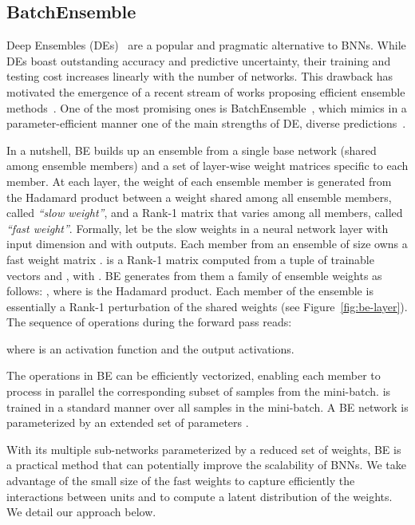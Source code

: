 \documentclass[10pt,twocolumn,letterpaper]{article}
\newcommand{\be}{BatchEnsemble\xspace}
\begin{document}
\subsection{BatchEnsemble}

Deep Ensembles (DEs)~\cite{lakshminarayanan2017simple} {are a popular and pragmatic alternative to BNNs. While DEs} boast outstanding accuracy and predictive uncertainty, 
their training and testing cost increases linearly with the number of networks. This drawback has motivated the emergence of a recent stream of works proposing efficient ensemble methods~\cite{ashukha2020pitfalls, franchi2019tradi, maddox2019simple, mehrtash2020pep, wen2020batchensemble}. One of the most promising ones is \be~\cite{wen2020batchensemble}, which mimics in a parameter-efficient manner one of the main strengths of DE, \ie diverse  predictions~\cite{fort2019deep}. 



In a nutshell, BE builds up an ensemble from a single base network (shared among ensemble members) and a set of layer-wise weight matrices specific to each member. At each layer, the weight of each ensemble member is generated from the Hadamard product between a weight shared among all ensemble members, called \emph{``slow weight''}, and a Rank-1 matrix that varies among all members, called \emph{``fast weight''}. Formally, let  be the slow weights in a neural network layer with input dimension  and with  outputs. Each member  from an ensemble of size  owns a fast weight matrix .  is a Rank-1 matrix computed from a tuple of trainable vectors  and , with . BE generates from them a family of ensemble weights as follows: , where  is the Hadamard product. Each  member of the ensemble is essentially a Rank-1 perturbation of the shared weights  (see Figure~\ref{fig:be-layer}).
The sequence of operations during the forward pass reads:

where  is an activation function and  the output activations. 

The operations in BE can be efficiently vectorized, enabling each member to process in parallel the corresponding subset of samples from the mini-batch.  is trained in a standard manner over all samples in the mini-batch. A BE network  is parameterized by an extended set of parameters 
.


With its multiple sub-networks parameterized by a reduced set of weights, BE is a practical method that can potentially improve the scalability of BNNs. We take advantage of the small size of the fast weights to capture efficiently the interactions between units and to compute a latent distribution of the weights. We detail our approach below.
\end{document}
